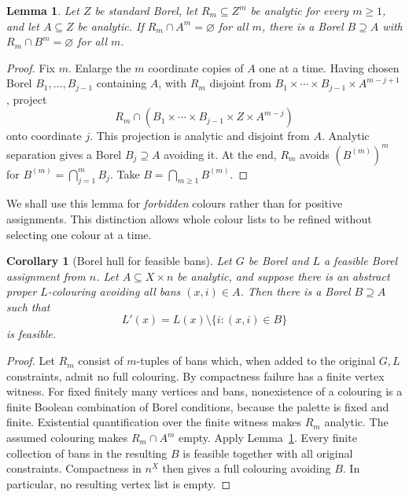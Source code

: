\documentclass[11pt,reqno]{amsart}
\theoremstyle{plain}
\newtheorem{lemma}[theorem]{Lemma}
\newtheorem{corollary}[theorem]{Corollary}
\theoremstyle{definition}
\theoremstyle{remark}
\begin{document}
\begin{lemma}\label{list-lem:hull}
Let $Z$ be standard Borel, let $R_m\subseteq Z^m$ be analytic for every
$m\ge1$, and let $A\subseteq Z$ be analytic. If $R_m\cap A^m=\varnothing$
for all $m$, there is a Borel $B\supseteq A$ with
$R_m\cap B^m=\varnothing$ for all $m$.
\end{lemma}

\begin{proof}
Fix $m$. Enlarge the $m$ coordinate copies of $A$ one at a time. Having
chosen Borel $B_1,\ldots,B_{j-1}$ containing $A$, with $R_m$ disjoint from
$B_1\times\cdots\times B_{j-1}\times A^{m-j+1}$, project
\[
R_m\cap(B_1\times\cdots\times B_{j-1}\times Z\times A^{m-j})
\]
onto coordinate $j$. This projection is analytic and disjoint from $A$.
Analytic separation gives a Borel $B_j\supseteq A$ avoiding it. At the end,
$R_m$ avoids $(B^{(m)})^m$ for $B^{(m)}=\bigcap_{j=1}^m B_j$.
Take $B=\bigcap_{m\ge1}B^{(m)}$.
\end{proof}

We shall use this lemma for \emph{forbidden} colours rather than for
positive assignments. This distinction allows whole colour lists to be
refined without selecting one colour at a time.

\begin{corollary}[Borel hull for feasible bans]\label{list-cor:bans}
Let $G$ be Borel and $L$ a feasible Borel assignment from $n$. Let
$A\subseteq X\times n$ be analytic, and suppose there is an abstract
proper $L$-colouring avoiding all bans $(x,i)\in A$. Then there is a Borel
$B\supseteq A$ such that
\[
L'(x)=L(x)\setminus\{i:(x,i)\in B\}
\]
is feasible.
\end{corollary}

\begin{proof}
Let $R_m$ consist of $m$-tuples of bans which, when added to the original
$G,L$ constraints, admit no full colouring. By compactness failure has a
finite vertex witness. For fixed finitely many vertices and bans,
nonexistence of a colouring is a finite Boolean combination of Borel
conditions, because the palette is fixed and finite. Existential
quantification over the finite witness makes $R_m$ analytic. The assumed
colouring makes $R_m\cap A^m$ empty. Apply Lemma~\ref{list-lem:hull}.
Every finite collection of bans in the resulting $B$ is feasible together
with all original constraints. Compactness in $n^X$ then gives a full
colouring avoiding $B$. In particular, no resulting vertex list is empty.
\end{proof}
\end{document}
